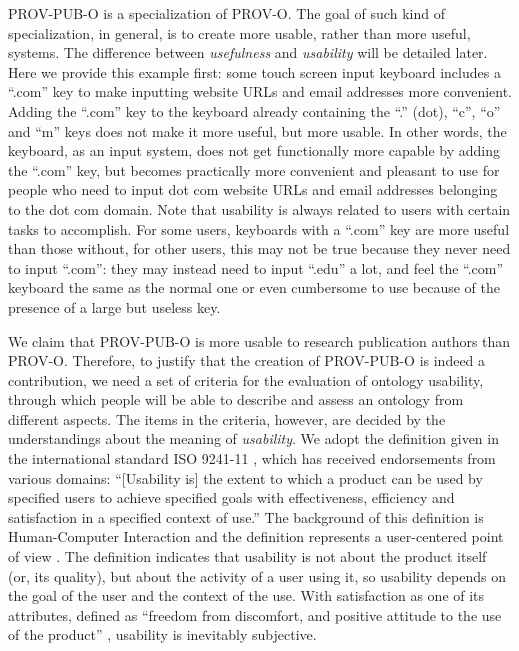PROV-PUB-O is a specialization of PROV-O. The goal of such kind of specialization, in general, is to create more usable, rather than more useful, systems. The difference between {\em usefulness} and {\em usability} will be detailed later. Here we provide this example first: some touch screen input keyboard includes a ``.com'' key to make inputting website URLs and email addresses more convenient. Adding the ``.com'' key to the keyboard already containing the ``.'' (dot), ``c'', ``o'' and ``m'' keys does not make it more useful, but more usable. In other words, the keyboard, as an input system, does not get functionally more capable by adding the ``.com'' key, but becomes practically more convenient and pleasant to use for people who need to input dot com website URLs and email addresses belonging to the dot com domain. Note that usability is always related to users with certain tasks to accomplish. For some users, keyboards with a ``.com'' key are more useful than those without, for other users, this may not be true because they never need to input ``.com'': they may instead need to input ``.edu'' a lot, and feel the ``.com'' keyboard the same as the normal one or even cumbersome to use because of the presence of a large but useless key.

We claim that PROV-PUB-O is more usable to research publication authors than PROV-O. Therefore, to justify that the creation of PROV-PUB-O is indeed a contribution, we need a set of criteria for the evaluation of ontology usability, through which people will be able to describe and assess an ontology from different aspects. The items in the criteria, however, are decided by the understandings about the meaning of \emph{usability}. We adopt the definition given in the international standard ISO 9241-11 \cite{iso19989241}, which has received endorsements from various domains: ``[Usability is] the extent to which a product can be used by specified users to achieve specified goals with effectiveness, efficiency and satisfaction in a specified context of use.'' The background of this definition is Human-Computer Interaction and the definition represents a user-centered point of view \cite{jokela2003standard}. The definition indicates that usability is not about the product itself (or, its quality), but about the activity of a user using it, so usability depends on the goal of the user and the context of the use. With satisfaction as one of its attributes, defined as ``freedom from discomfort, and positive attitude to the use of the product'' \cite{iso19989241}, usability is inevitably subjective.

